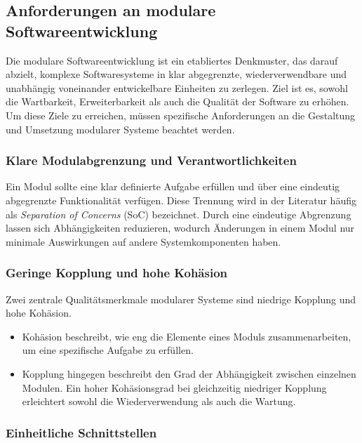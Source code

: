 \subsection{Anforderungen an modulare Softwareentwicklung}
\label{subsec:anforderungen-an-modulare-softwareentwicklung}

Die modulare Softwareentwicklung ist ein etabliertes Denkmuster, das darauf abzielt, komplexe Softwaresysteme in klar abgegrenzte, wiederverwendbare und unabhängig voneinander entwickelbare Einheiten zu zerlegen.
Ziel ist es, sowohl die Wartbarkeit, Erweiterbarkeit als auch die Qualität der Software zu erhöhen.
Um diese Ziele zu erreichen, müssen spezifische Anforderungen an die Gestaltung und Umsetzung modularer Systeme beachtet werden.


\subsubsection{Klare Modulabgrenzung und Verantwortlichkeiten}

Ein Modul sollte eine klar definierte Aufgabe erfüllen und über eine eindeutig abgegrenzte Funktionalität verfügen.
Diese Trennung wird in der Literatur häufig als \textit{Separation of Concerns} (SoC) bezeichnet.
Durch eine eindeutige Abgrenzung lassen sich Abhängigkeiten reduzieren, wodurch Änderungen in einem Modul nur minimale Auswirkungen auf andere Systemkomponenten haben.


\subsubsection{Geringe Kopplung und hohe Kohäsion}

Zwei zentrale Qualitätsmerkmale modularer Systeme sind niedrige Kopplung und hohe Kohäsion.


\begin{itemize}

\item
Kohäsion beschreibt, wie eng die Elemente eines Moduls zusammenarbeiten, um eine spezifische Aufgabe zu erfüllen.
\item
Kopplung hingegen beschreibt den Grad der Abhängigkeit zwischen einzelnen Modulen.
Ein hoher Kohäsionsgrad bei gleichzeitig niedriger Kopplung erleichtert sowohl die Wiederverwendung als auch die Wartung.

\end{itemize}

\subsubsection{Einheitliche Schnittstellen}

